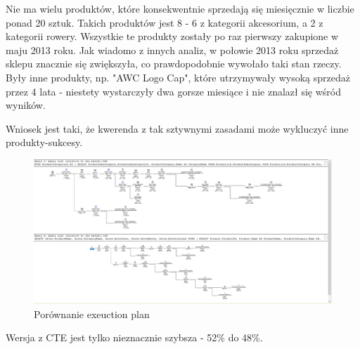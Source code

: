 \documentclass[a4paper,12pt]{article}
\begin{document}
Nie ma wielu produktów, które konsekwentnie sprzedają się miesięcznie w liczbie ponad 20 sztuk. Takich produktów jest 8 - 6 z kategorii akcesorium, a 2 z kategorii rowery. Wszystkie te produkty zostały po raz pierwszy zakupione w maju 2013 roku. Jak wiadomo z innych analiz, w połowie 2013 roku sprzedaż sklepu znacznie się zwiększyła, co prawdopodobnie wywołało taki stan rzeczy. Były inne produkty, np. "AWC Logo Cap", które utrzymywały wysoką sprzedaż przez 4 lata - niestety wystarczyły dwa gorsze miesiące i nie znalazł się wśród wyników.

Wniosek jest taki, że kwerenda z tak sztywnymi zasadami może wykluczyć inne produkty-sukcesy.

\begin{figure}[H]
	\centering
	\includegraphics[width=1.0\textwidth]{images/3_execution_plan.png}
	\caption{Porównanie exeuction plan}
\end{figure}

Wersja z CTE jest tylko nieznacznie szybsza - 52\% do 48\%.
\end{document}

